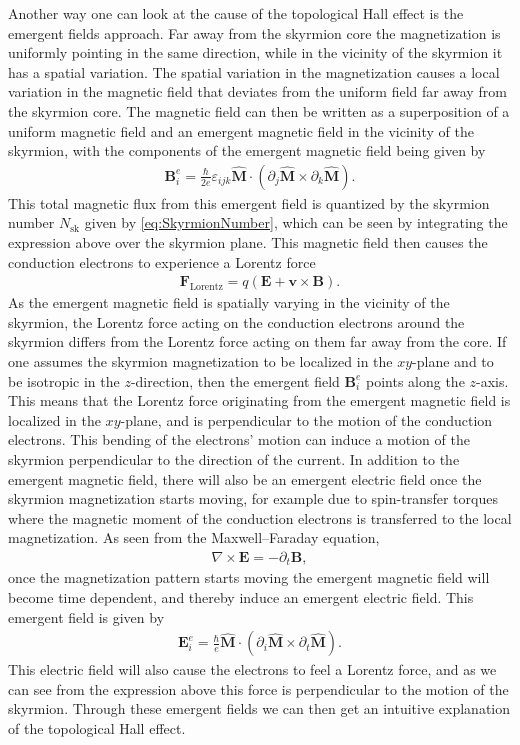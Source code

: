 Another way one can look at the cause of the topological Hall effect is the emergent fields approach. Far away from the skyrmion core the magnetization is uniformly pointing in the same direction, while in the vicinity of the skyrmion it has a spatial variation. The spatial variation in the magnetization causes a local variation in the magnetic field that deviates from the uniform field far away from the skyrmion core. The magnetic field can then be written as a superposition of a uniform magnetic field and an emergent magnetic field in the vicinity of the skyrmion, with the components of the emergent magnetic field being given by \cite{Nagaosa2012, Schulz2012}
\begin{align}
    \mathbold{B}_i^e = \frac{\hbar}{2e}\varepsilon_{ijk}\mathbold{\hat{M}}\cdot(\partial_j\mathbold{\hat{M}}\times \partial_k \mathbold{\hat{M}}).
\end{align}
This total magnetic flux from this emergent field is quantized by the skyrmion number $N_{\textrm{sk}}$ given by \eqref{eq:SkyrmionNumber}, which can be seen by integrating the expression above over the skyrmion plane. This magnetic field then causes the conduction electrons to experience a Lorentz force
\begin{align}
    \mathbold{F}_{\textrm{Lorentz}} = q(\mathbold{E} + \mathbold{v}\times\mathbold{B}).
\end{align}
As the emergent magnetic field is spatially varying in the vicinity of the skyrmion, the Lorentz force acting on the conduction electrons around the skyrmion differs from the Lorentz force acting on them far away from the core. If one assumes the skyrmion magnetization to be localized in the $xy$-plane and to be isotropic in the $z$-direction, then the emergent field $\mathbold{B}_i^e$ points along the $z$-axis. This means that the Lorentz force originating from the emergent magnetic field is localized in the $xy$-plane, and is perpendicular to the motion of the conduction electrons. This bending of the electrons' motion can induce a motion of the skyrmion perpendicular to the direction of the current. In addition to the emergent magnetic field, there will also be an emergent electric field once the skyrmion magnetization starts moving, for example due to spin-transfer torques where the magnetic moment of the conduction electrons is transferred to the local magnetization. As seen from the Maxwell--Faraday equation,
\begin{align}
    \nabla\times\mathbold{E} = -\partial_t\mathbold{B},
\end{align}
once the magnetization pattern starts moving the emergent magnetic field will become time dependent, and thereby induce an emergent electric field. This emergent field is given by
\begin{align}
\label{eq:EmergentE}
\mathbold{E}_i^e = \frac{\hbar}{e} \mathbold{\hat{M}}\cdot(\partial_i\mathbold{\hat{M}}\times\partial_t\mathbold{\hat{M}}).
\end{align}
This electric field will also cause the electrons to feel a Lorentz force, and as we can see from the expression above this force is perpendicular to the motion of the skyrmion. Through these emergent fields we can then get an intuitive explanation of the topological Hall effect.